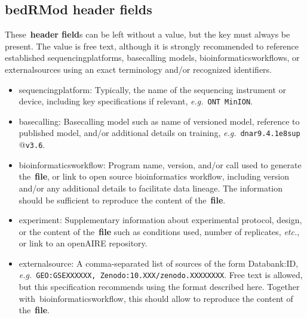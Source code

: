 \documentclass[11pt]{article}
\begin{document}
\subsection{\acs{bedRMod} header fields}\label{sec:recommend-fields}
These~\textbf{header field}s can be left without a value, but the key must always be present. The value is free text, although it is strongly recommended
to reference established \textsf{sequencing\textunderscore platform}s, \textsf{basecalling} models, \textsf{bioinformatics\textunderscore workflow}s, or \textsf{external\textunderscore source}s using an exact terminology and/or recognized identifiers.  
\begin{itemize}
\item \textsf{sequencing\textunderscore platform}: Typically, the name of the sequencing instrument or device, including key specifications if relevant, \textit{e.g.}~\texttt{ONT MinION}.

\item \textsf{basecalling}: Basecalling model such as name of versioned model, reference to published model, and/or additional details on training, \textit{e.g.}~\texttt{dna\textunderscore r9.4.1\textunderscore e8\textunderscore sup$@$v3.6}.

\item \textsf{bioinformatics\textunderscore workflow}: Program name, version, and/or call used to generate the~\textbf{file}, or link to open source bioinformatics workflow, including version and/or any additional details to facilitate data lineage. The information should be sufficient to reproduce the content of the~\textbf{file}.

\item \textsf{experiment}: Supplementary information about experimental protocol, design, or the content of the~\textbf{file} such as conditions used, number of replicates, \textit{etc.}, or link to an openAIRE repository.

\item \textsf{external\textunderscore source}: A comma-separated list of sources of the form Databank:ID, \textit{e.g.}~\texttt{GEO:GSEXXXXXX, Zenodo:10.XXX/zenodo.XXXXXXXX}. Free text is allowed, but this specification recommends using the format described here. Together with~\textsf{bioinformatics\textunderscore workflow}, this should allow to reproduce the content of the~\textbf{file}.
\end{itemize}
\end{document}
